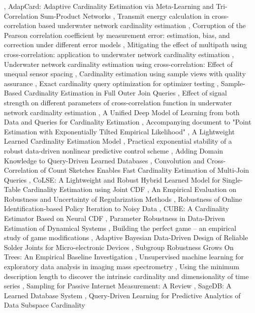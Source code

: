 \documentclass{article}
\begin{document}
\cite{qiao2021cardinalitybef380c1}, AdapCard: Adaptive Cardinality Estimation via Meta-Learning and Tri-Correlation Sum-Product Networks \cite{gong2026adapcardc8d305fc}, Transmit energy calculation in cross-correlation based underwater network cardinality estimation \cite{chowdhury2015transmit799787c0}, Corruption of the Pearson correlation coefficient by measurement error: estimation, bias, and correction under different error models \cite{saccenti2019corruptiond58f658b}, Mitigating the effect of multipath using cross-correlation: application to underwater network cardinality estimation \cite{anower2016mitigating631bfe04}, Underwater network cardinality estimation using cross-correlation: Effect of unequal sensor spacing \cite{dash2016underwaterf3849df5}, Cardinality estimation using sample views with quality assurance \cite{larson2007cardinality16fa51bf}, Exact cardinality query optimization for optimizer testing \cite{chaudhuri2009exacta978e994}, Sample-Based Cardinality Estimation in Full Outer Join Queries \cite{grigorev2024samplebasedbc7f3161}, Effect of signal strength on different parameters of cross-correlation function in underwater network cardinality estimation \cite{chowdhury2014effectc54dec3d}, A Unified Deep Model of Learning from both Data and Queries for Cardinality Estimation \cite{wu2021unifiedd0f952e8}, Accompanying document to "Point Estimation with Exponentially Tilted Empirical Likelihood" \cite{schennach2005accompanying4a68c731}, A Lightweight Learned Cardinality Estimation Model \cite{zhu2025lightweight443d61f0}, Practical exponential stability of a robust data-driven nonlinear predictive control scheme \cite{alsalti2022practicale434289f}, Adding Domain Knowledge to Query-Driven Learned Databases \cite{wu2023adding48d80645}, Convolution and Cross-Correlation of Count Sketches Enables Fast Cardinality Estimation of Multi-Join Queries \cite{heddes2024convolution3eba72ef}, CoLSE: A Lightweight and Robust Hybrid Learned Model for Single-Table Cardinality Estimation using Joint CDF \cite{rathuwadu2025colse332276ce}, An Empirical Evaluation on Robustness and Uncertainty of Regularization Methods \cite{chun2020empirical8a838114}, Robustness of Online Identification-based Policy Iteration to Noisy Data \cite{song2025robustness59156f42}, CUBE: A Cardinality Estimator Based on Neural CDF \cite{yan2025cubeb20a06b8}, Parameter Robustness in Data-Driven Estimation of Dynamical Systems \cite{pandey2025parameterc85aecac}, Building the perfect game -- an empirical study of game modifications \cite{lee2021buildingea5ced93}, Adaptive Bayesian Data-Driven Design of Reliable Solder Joints for Micro-electronic Devices \cite{guo2025adaptivebc724aff}, Subgroup Robustness Grows On Trees: An Empirical Baseline Investigation \cite{gardner2022subgroupcb026453}, Unsupervised machine learning for exploratory data analysis in imaging mass spectrometry \cite{verbeeck2019unsupervised69ed6eb5}, Using the minimum description length to discover the intrinsic cardinality and dimensionality of time series \cite{hu2014using9dcb3251}, Sampling for Passive Internet Measurement: A Review \cite{duffield2004samplingbd4fa623}, SageDB: A Learned Database System \cite{kraska2019sagedb81abb626}, Query-Driven Learning for Predictive Analytics of Data Subspace Cardinality 
\end{document}
